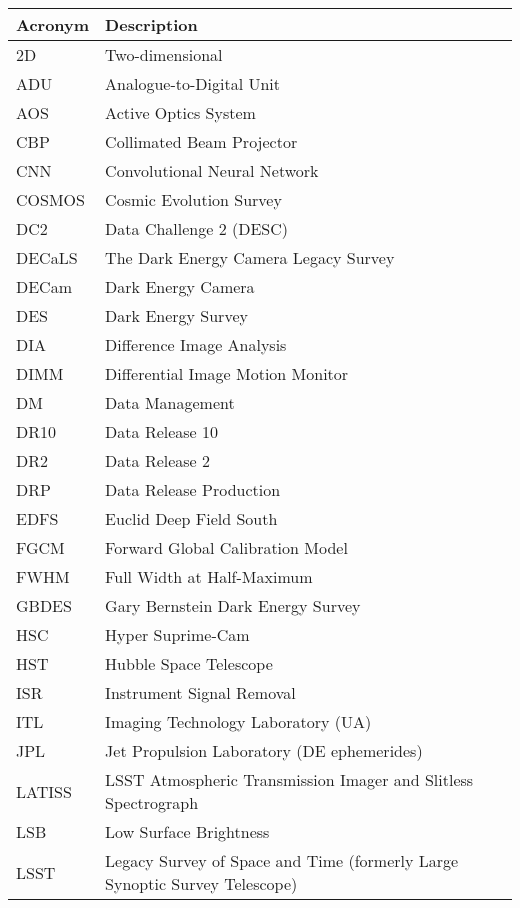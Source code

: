\addtocounter{table}{-1}
\begin{longtable}{p{}p{}}\hline
\textbf{Acronym} & \textbf{Description}  \\\hline

2D & Two-dimensional \\\hline
ADU & Analogue-to-Digital Unit \\\hline
AOS & Active Optics System \\\hline
CBP & Collimated Beam Projector \\\hline
CNN & Convolutional Neural Network \\\hline
COSMOS & Cosmic Evolution Survey \\\hline
DC2 & Data Challenge 2 (DESC) \\\hline
DECaLS & The Dark Energy Camera Legacy Survey \\\hline
DECam & Dark Energy Camera \\\hline
DES & Dark Energy Survey \\\hline
DIA & Difference Image Analysis \\\hline
DIMM & Differential Image Motion Monitor \\\hline
DM & Data Management \\\hline
DR10 & Data Release 10 \\\hline
DR2 & Data Release 2 \\\hline
DRP & Data Release Production \\\hline
EDFS & Euclid Deep Field South \\\hline
FGCM & Forward Global Calibration Model \\\hline
FWHM & Full Width at Half-Maximum \\\hline
GBDES & Gary Bernstein Dark Energy Survey \\\hline
HSC & Hyper Suprime-Cam \\\hline
HST & Hubble Space Telescope \\\hline
ISR & Instrument Signal Removal \\\hline
ITL & Imaging Technology Laboratory (UA) \\\hline
JPL & Jet Propulsion Laboratory (DE ephemerides) \\\hline
LATISS & LSST Atmospheric Transmission Imager and Slitless Spectrograph \\\hline
LSB & Low Surface Brightness \\\hline
LSST & Legacy Survey of Space and Time (formerly Large Synoptic Survey Telescope) \\\hline

\end{longtable}
